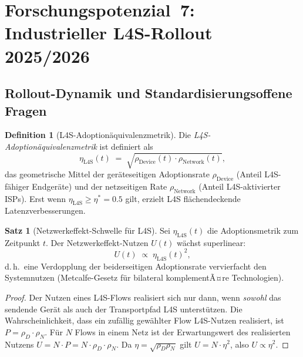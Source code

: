﻿\documentclass[a4paper,12pt]{article}
\theoremstyle{definition}
\newtheorem{definition}{Definition}
\newtheorem{satz}{Satz}
\begin{document}
\section{Forschungspotenzial~7: Industrieller L4S-Rollout 2025/2026}

\subsection{Rollout-Dynamik und Standardisierungsoffene Fragen}

\begin{definition}[L4S-Adoption\"{a}quivalenzmetrik]
    Die \emph{L4S-Adoption\"{a}quivalenzmetrik} ist definiert als
    \[
        \eta_{\mathrm{L4S}}(t) \;=\; \sqrt{\rho_{\mathrm{Device}}(t) \cdot \rho_{\mathrm{Network}}(t)},
    \]
    das geometrische Mittel der ger\"{a}teseitigen Adoptionsrate
    $\rho_{\mathrm{Device}}$ (Anteil L4S-f\"{a}higer Endger\"{a}te) und der
    netzseitigen Rate $\rho_{\mathrm{Network}}$ (Anteil L4S-aktivierter ISPs).
    Erst wenn $\eta_{\mathrm{L4S}} \geq \eta^* = 0.5$ gilt, erzielt L4S
    fl\"{a}chendeckende Latenzverbesserungen.
\end{definition}

\begin{satz}[Netzwerkeffekt-Schwelle f\"{u}r L4S]
    \label{satz:rollout}
    Sei $\eta_{\mathrm{L4S}}(t)$ die Adoptionsmetrik zum Zeitpunkt $t$.
    Der Netzwerkeffekt-Nutzen $U(t)$ w\"{a}chst superlinear:
    \[
        U(t) \;\propto\; \eta_{\mathrm{L4S}}(t)^2,
    \]
    d.\,h.\ eine Verdopplung der beiderseitigen Adoptionsrate vervierfacht den
    Systemnutzen (Metcalfe-Gesetz f\"{u}r bilateral komplementÃ¤re Technologien).
\end{satz}

\begin{proof}
    Der Nutzen eines L4S-Flows realisiert sich nur dann, wenn \emph{sowohl}
    das sendende Ger\"{a}t als auch der Transportpfad L4S unterst\"{u}tzen. Die
    Wahrscheinlichkeit, dass ein zuf\"{a}llig gew\"{a}hlter Flow L4S-Nutzen realisiert,
    ist $P = \rho_D \cdot \rho_N$. F\"{u}r $N$ Flows in einem Netz ist der
    Erwartungswert des realisierten Nutzens $U = N \cdot P = N \cdot \rho_D \cdot \rho_N$.
    Da $\eta = \sqrt{\rho_D \rho_N}$ gilt $U = N \cdot \eta^2$, also
    $U \propto \eta^2$.
\end{proof}
\end{document}
